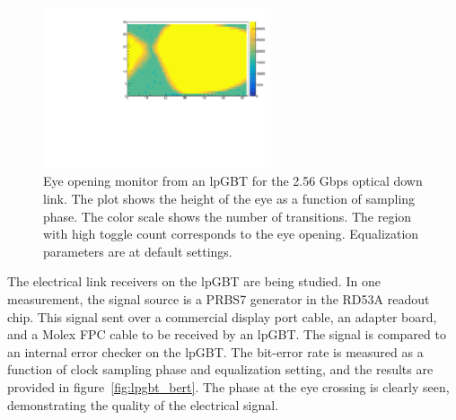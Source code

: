 \documentclass[a4paper,11pt]{article}
\begin{document}

\begin{figure}[htbp]
\centering
\includegraphics[width=0.6\textwidth,origin=c]{../figures/lpGBT_eye.pdf}
\caption{
\label{fig:lpgbt_eye}
Eye opening monitor from an lpGBT for the 2.56 Gbps optical down link.
The plot shows the height of the eye as a function of sampling phase.
The color scale shows the number of transitions.
The region with high toggle count corresponds to the eye opening.
Equalization parameters are at default settings.
}
\end{figure}


The electrical link receivers on the lpGBT are being studied.
In one measurement, the signal source is a PRBS7 generator in the RD53A readout chip.
This signal sent over a commercial display port cable, an adapter board, and a Molex FPC cable to be received by an lpGBT.
The signal is compared to an internal error checker on the lpGBT.
The bit-error rate is measured as a function of clock sampling phase and equalization setting, and the results are provided in figure~\ref{fig:lpgbt_bert}.
The phase at the eye crossing is clearly seen, demonstrating the quality of the electrical signal.

\end{document}
